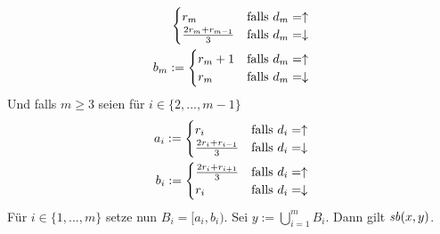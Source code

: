 \begin{bew}
\begin{align*}
\begin{cases}
                r_m & \text{falls $d_m = \uparrow$}\\
                \frac{2r_m + r_{m-1}}{3} & \text{falls $d_m = \downarrow$}
            \end{cases}\\
        b_m := 
            \begin{cases}
                r_m+1 & \text{falls $d_m = \uparrow$}\\
                r_m & \text{falls $d_m = \downarrow$}
            \end{cases}
    \end{align*}
    Und falls $m \geq 3$ seien für $i \in \{2, ..., m-1\}$
    \begin{align*}
        a_i := 
            \begin{cases}
                r_i & \text{falls $d_i = \uparrow$}\\
                \frac{2r_i + r_{i-1}}{3} & \text{falls $d_i = \downarrow$}
            \end{cases}\\
        b_i := 
            \begin{cases}
                \frac{2r_i + r_{i+1}}{3} & \text{falls $d_i = \uparrow$}\\
                r_i & \text{falls $d_i = \downarrow$}
            \end{cases}
    \end{align*}
    Für $i \in \{1, ..., m\}$ setze nun $B_i = [a_i, b_i)$.
    Sei $y := \bigcup_{i=1}^m B_i$.
    Dann gilt $\mathit{sb}(x,y)$.
\end{bew}








